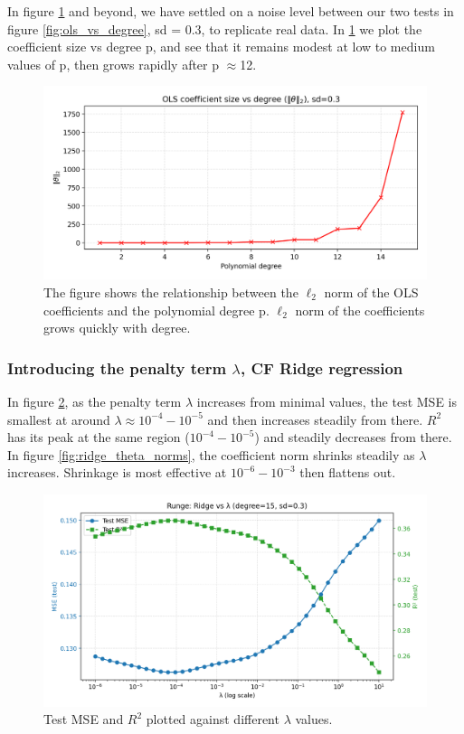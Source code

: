 \documentclass[amssymb,twocolumn,aps]{revtex4-2}
\begin{document}
In figure \ref{fig:norms_vs_degree} and beyond, we have settled on a noise level between our two tests in figure \ref{fig:ols_vs_degree}, sd = 0.3, to replicate real data. In \ref{fig:norms_vs_degree} we plot the coefficient size vs degree p, and see that it remains modest at low to medium values of p, then grows rapidly after p $\approx$12. 

\begin{figure}[H]
    \centering
    \includegraphics[width=1\linewidth]{Project-1/Figures/runge_ols_theta_norms_vs_degree.png}
    \caption{The figure shows the relationship between the $\ell_2$ norm of the OLS coefficients and the polynomial degree p. $\ell_2$ norm of the coefficients grows quickly with degree.}
    \label{fig:norms_vs_degree}
\end{figure}

\subsubsection{Introducing the penalty term $\lambda$, CF Ridge regression}

In figure \ref{fig:ridge_mse_lambda}, as the penalty term $\lambda$ increases from minimal values, the test MSE is smallest at around $\lambda \approx 10^{-4}-10^{-5}$ and then increases steadily from there. $R^2$ has its peak at the same region ($10^{-4}-10^{-5}$) and steadily decreases from there. In figure \ref{fig:ridge_theta_norms}, the coefficient norm shrinks steadily as $\lambda$ increases. Shrinkage is most effective at $10^{-6}-10^{-3}$ then flattens out. 

\begin{figure}[H]
    \centering
    \includegraphics[width=1\linewidth]{Project-1/Figures/runge_ridge_mse_r2_vs_lambda.png}
    \caption{Test MSE and $R^2$ plotted against different $\lambda$ values.}
    \label{fig:ridge_mse_lambda}
\end{figure}
\end{document}
